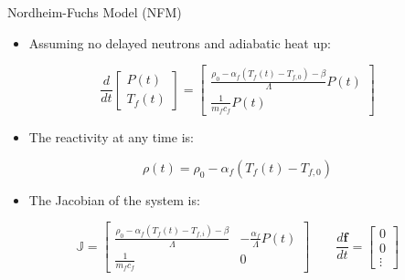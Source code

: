 \documentclass[serif]{beamer}
\begin{document}
\begin{frame}{Nordheim-Fuchs Model (NFM)}
  \begin{itemize}
    \item Assuming no delayed neutrons and adiabatic heat up:
  \end{itemize}
  \begin{equation}
    \nonumber
    \frac{d}{dt}\left[\begin{array}{c}
                        P\left(t\right) \\
                        T_f\left(t\right)
                      \end{array}\right] =
                \left[\begin{array}{c}
                        \frac{\rho_0 - \alpha_f\left(T_f\left(t\right) - T_{f,0}\right) - \beta}{\Lambda}P\left(t\right) \\
                        \frac{1}{m_fc_f}P\left(t\right)
                      \end{array}\right]
  \end{equation}
  \begin{itemize}
   \item The reactivity at any time is:
  \end{itemize}
  \begin{equation}
    \nonumber
    \rho\left(t\right) = \rho_0 - \alpha_f\left(T_f\left(t\right) - T_{f,0}\right)
  \end{equation}
  \begin{itemize}
   \item The Jacobian of the system is:
  \end{itemize}
  \begin{equation}
    \nonumber
    \mathbb{J} = \left[\begin{array}{cc}
                         \frac{\rho_0 - \alpha_f\left(T_f\left(t\right) - T_{f,i}\right) - \beta}{\Lambda} & -\frac{\alpha_f}{\Lambda}P\left(t\right) \\
                         \frac{1}{m_fc_f} & 0
                       \end{array}\right]
     \qquad
     \frac{d\mathbf{f}}{dt} = \left[\begin{array}{c}
                        0 \\
                        0 \\
                        \vdots
                      \end{array}\right]
  \end{equation}
\end{frame}
\end{document}
